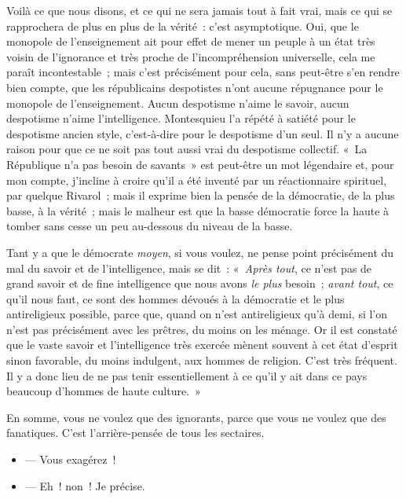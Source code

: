 \documentclass[french,twoside]{book} %
\begin{document}
Voilà ce que nous disons, et ce qui ne sera jamais tout à fait vrai, mais ce qui se rapprochera de plus en plus de la vérité : c’est asymptotique. Oui, que le monopole de l’enseignement ait pour effet de mener un peuple à un état très voisin de l’ignorance et très proche de l’incompréhension universelle, cela me paraît incontestable ; mais c’est précisément pour cela, sans peut-être s’en rendre bien compte, que les républicains despotistes n’ont aucune répugnance pour le monopole de l’enseignement. Aucun despotisme n’aime le savoir, aucun despotisme n’aime l’intelligence. Montesquieu l’a répété à satiété pour le despotisme ancien style, c’est-à-dire pour le despotisme d’un seul. Il n’y a aucune raison pour que ce ne soit pas tout aussi vrai du despotisme collectif. « La République n’a pas besoin de savants » est peut-être un mot légendaire et, pour mon compte,  j’incline à croire qu’il a été inventé par un réactionnaire spirituel, par quelque Rivarol ; mais il exprime bien la pensée de la démocratie, de la plus basse, à la vérité ; mais le malheur est que la basse démocratie force la haute à tomber sans cesse un peu au-dessous du niveau de la basse.\par
Tant y a que le démocrate {\itshape moyen}, si vous voulez, ne pense point précisément du mal du savoir et de l’intelligence, mais se dit : « {\itshape Après tout}, ce n’est pas de grand savoir et de fine intelligence que nous avons {\itshape le plus} besoin ; {\itshape avant tout}, ce qu’il nous faut, ce sont des hommes dévoués à la démocratie et le plus antireligieux possible, parce que, quand on n’est antireligieux qu’à demi, si l’on n’est pas précisément avec les prêtres, du moins on les ménage. Or il est constaté que le vaste savoir et l’intelligence très exercée mènent souvent à cet état d’esprit sinon favorable, du moins indulgent, aux hommes de religion. C’est très fréquent. Il y a donc lieu de ne pas tenir essentiellement à ce qu’il y ait dans ce pays beaucoup d’hommes de haute culture. »\par
En somme, vous ne voulez que des ignorants, parce que vous ne voulez que des fanatiques. C’est l’arrière-pensée de tous les sectaires.\par

\begin{itemize}[itemsep=0pt,]
\item  — Vous exagérez !
\item  — Eh ! non ! Je précise.
\end{itemize}
\end{document}

